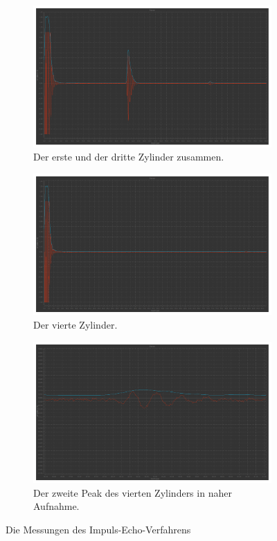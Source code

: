 \begin{figure}
  \begin{subfigure}{0.48\textwidth}%
  \centering%
  \includegraphics[width=\linewidth]{pictures/Impuls-Echo-Zylinder/z1_z3.pdf}%
  \caption{Der erste und der dritte Zylinder zusammen.}%
  \label{fig:echo_z1_z3}%
  \end{subfigure}%
  \hfill%
  \begin{subfigure}{0.48\textwidth}%
  \centering%
  \includegraphics[width=\linewidth]{pictures/Impuls-Echo-Zylinder/z4_(1).pdf}%
  \caption{Der vierte Zylinder.}%
  \label{fig:echo_z4_(1)}%
  \end{subfigure}%
  \hfill

  \begin{subfigure}{\textwidth}%
  \centering%
  \includegraphics[width=0.48 \linewidth]{pictures/Impuls-Echo-Zylinder/z4_(2).pdf}%
  \caption{Der zweite Peak des vierten Zylinders in naher Aufnahme.}%
  \label{fig:echo_z4_(2)}%
  \end{subfigure}%
  \caption{Die Messungen des Impuls-Echo-Verfahrens}%
  \label{fig:echo_messungen}%
\end{figure}%


